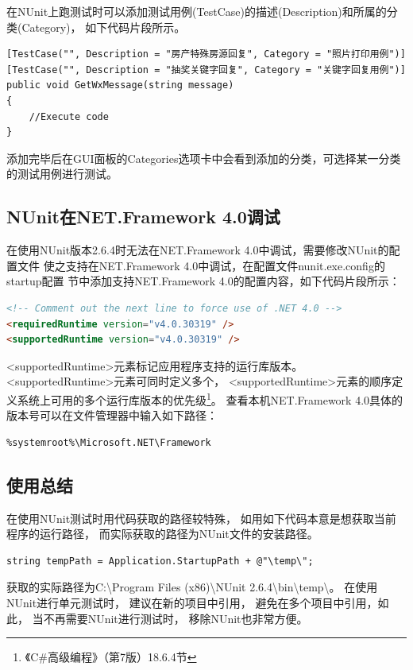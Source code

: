 \documentclass{book}
\begin{document}
在NUnit上跑测试时可以添加测试用例(TestCase)的描述(Description)和所属的分类(Category)，
如下代码片段所示。

\begin{lstlisting}[language={[Sharp]C}]
[TestCase("", Description = "房产特殊房源回复", Category = "照片打印用例")]
[TestCase("", Description = "抽奖关键字回复", Category = "关键字回复用例")]
public void GetWxMessage(string message)
{
	//Execute code
}
\end{lstlisting}

添加完毕后在GUI面板的Categories选项卡中会看到添加的分类，可选择某一分类的测试用例进行测试。

\subsection{NUnit在NET.Framework 4.0调试}

在使用NUnit版本2.6.4时无法在NET.Framework 4.0中调试，需要修改NUnit的配置文件
使之支持在NET.Framework 4.0中调试，在配置文件nunit.exe.config的startup配置
节中添加支持NET.Framework 4.0的配置内容，如下代码片段所示：

\begin{lstlisting}[language=HTML]
<!-- Comment out the next line to force use of .NET 4.0 -->
<requiredRuntime version="v4.0.30319" />
<supportedRuntime version="v4.0.30319" />
\end{lstlisting}

<supportedRuntime>元素标记应用程序支持的运行库版本。
<supportedRuntime>元素可同时定义多个，
<supportedRuntime>元素的顺序定义系统上可用的多个运行库版本的优先级\footnote{《C\#高级编程》（第7版）18.6.4节}。
查看本机NET.Framework 4.0具体的版本号可以在文件管理器中输入如下路径：
\begin{lstlisting}
%systemroot%\Microsoft.NET\Framework
\end{lstlisting}

\subsection{使用总结}


在使用NUnit测试时用代码获取的路径较特殊，
如用如下代码本意是想获取当前程序的运行路径，
而实际获取的路径为NUnit文件的安装路径。

\begin{lstlisting}[language={[Sharp]C}]
string tempPath = Application.StartupPath + @"\temp\";
\end{lstlisting}

获取的实际路径为C:\textbackslash Program Files (x86)\textbackslash NUnit 2.6.4\textbackslash bin\textbackslash temp\textbackslash 。
在使用NUnit进行单元测试时，
建议在新的项目中引用，
避免在多个项目中引用，如此，
当不再需要NUnit进行测试时，
移除NUnit也非常方便。
\end{document}
